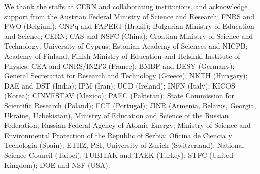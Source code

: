 We thank the staffs at CERN and collaborating institutions, and
acknowledge support from the
%
Austrian Federal Ministry of Science and Research; FNRS and FWO (Belgium); 
CNPq and FAPERJ (Brazil); 
Bulgarian Ministry of Education and Science; 
CERN; 
CAS and NSFC (China); 
Croatian Ministry of Science and Technology; 
University of Cyprus; 
Estonian Academy of Sciences and NICPB; 
Academy of Finland, Finish Ministry of Education and Helsinki Institute of Physics; 
CEA and CNRS/IN2P3 (France); 
BMBF and DESY (Germany); 
General Secretariat for Research and Technology (Greece); 
NKTH (Hungary); 
DAE and DST (India); 
IPM (Iran); 
UCD (Ireland); 
INFN (Italy); 
KICOS (Korea); 
CINVESTAV (Mexico); 
PAEC (Pakistan); 
State Commission for Scientific Research (Poland); 
FCT (Portugal); 
JINR (Armenia, Belarus, Georgia, Ukraine, Uzbekistan),
Ministry of Education and Science of the Russian Federation, 
Russian Federal Agency of Atomic Energy; 
Ministry of Science and Environmental Protection of the Republic of Serbia; 
Oficina de Ciencia y Tecnologia (Spain); 
ETHZ, PSI, University of Zurich (Switzerland); 
National Science Council (Taipei); 
TUBITAK and TAEK (Turkey); 
STFC (United Kingdom); 
DOE and NSF (USA).